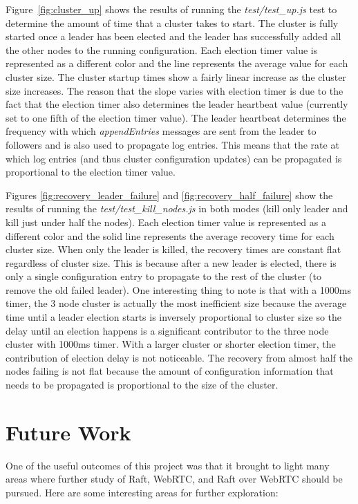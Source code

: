 \documentclass[conference,compsoc]{./IEEEtran/IEEEtran}
\begin{document}
Figure~\ref{fig:cluster_up} shows the results of running the \emph{test/test\_up.js} test to determine the amount of time that a cluster takes to start. The cluster is fully started once a leader has been elected and the leader has successfully added all the other nodes to the running configuration. Each election timer value is represented as a different color and the line represents the average value for each cluster size. The cluster startup times show a fairly linear increase as the cluster size increases. The reason that the slope varies with election timer is due to the fact that the election timer also determines the leader heartbeat value (currently set to one fifth of the election timer value). The leader heartbeat determines the frequency with which \emph{appendEntries} messages are sent from the leader to followers and is also used to propagate log entries.  This means that the rate at which log entries (and thus cluster configuration updates) can be propagated is proportional to the election timer value.

Figures \ref{fig:recovery_leader_failure} and \ref{fig:recovery_half_failure} show the results of running the \emph{test/test\_kill\_nodes.js} in both modes (kill only leader and kill just under half the nodes). Each election timer value is represented as a different color and the solid line represents the average recovery time for each cluster size. When only the leader is killed, the recovery times are constant flat regardless of cluster size. This is because after a new leader is elected, there is only a single configuration entry to propagate to the rest of the cluster (to remove the old failed leader). One interesting thing to note is that with a 1000ms timer, the 3 node cluster is actually the most inefficient size because the average time until a leader election starts is inversely proportional to cluster size so the delay until an election happens is a significant contributor to the three node cluster with 1000ms timer. With a larger cluster or shorter election timer, the contribution of election delay is not noticeable. The recovery from almost half the nodes failing is not flat because the amount of configuration information that needs to be propagated is proportional to the size of the cluster.

\section{Future Work}

One of the useful outcomes of this project was that it brought to light many areas where further study of Raft, WebRTC, and Raft over WebRTC should be pursued. Here are some interesting areas for further exploration:
\end{document}
